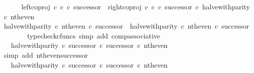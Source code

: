 \begin{isabellebody}
\ \ \ \ \ \ {\isacharparenleft}{\kern0pt}{\isacharparenleft}{\kern0pt}left{\isacharunderscore}{\kern0pt}coproj\ {\isasymnat}\isactrlsub c\ {\isasymnat}\isactrlsub c\ {\isasymcirc}\isactrlsub c\ successor{\isacharparenright}{\kern0pt}\ {\isasymamalg}\ {\isacharparenleft}{\kern0pt}right{\isacharunderscore}{\kern0pt}coproj\ {\isasymnat}\isactrlsub c\ {\isasymnat}\isactrlsub c\ {\isasymcirc}\isactrlsub c\ successor{\isacharparenright}{\kern0pt}{\isacharparenright}{\kern0pt}\ {\isasymcirc}\isactrlsub c\ halve{\isacharunderscore}{\kern0pt}with{\isacharunderscore}{\kern0pt}parity\ {\isasymcirc}\isactrlsub c\ nth{\isacharunderscore}{\kern0pt}even{\isachardoublequoteclose}\isanewline
\ \ \isamarkupfalse%
\ {\isacharminus}{\kern0pt}\isanewline
\ \ \ \ \isamarkupfalse%
\ {\isachardoublequoteopen}{\isacharparenleft}{\kern0pt}halve{\isacharunderscore}{\kern0pt}with{\isacharunderscore}{\kern0pt}parity\ {\isasymcirc}\isactrlsub c\ nth{\isacharunderscore}{\kern0pt}even{\isacharparenright}{\kern0pt}\ {\isasymcirc}\isactrlsub c\ successor\ {\isacharequal}{\kern0pt}\ halve{\isacharunderscore}{\kern0pt}with{\isacharunderscore}{\kern0pt}parity\ {\isasymcirc}\isactrlsub c\ nth{\isacharunderscore}{\kern0pt}even\ {\isasymcirc}\isactrlsub c\ successor{\isachardoublequoteclose}\isanewline
\ \ \ \ \ \ \isamarkupfalse%
\ {\isacharparenleft}{\kern0pt}typecheck{\isacharunderscore}{\kern0pt}cfuncs{\isacharcomma}{\kern0pt}\ simp\ add{\isacharcolon}{\kern0pt}\ comp{\isacharunderscore}{\kern0pt}associative{}{\isacharparenright}{\kern0pt}\isanewline
\ \ \ \ \isamarkupfalse%
\ \isamarkupfalse%
\ {\isachardoublequoteopen}{\isachardot}{\kern0pt}{\isachardot}{\kern0pt}{\isachardot}{\kern0pt}\ {\isacharequal}{\kern0pt}\ halve{\isacharunderscore}{\kern0pt}with{\isacharunderscore}{\kern0pt}parity\ {\isasymcirc}\isactrlsub c\ {\isacharparenleft}{\kern0pt}successor\ {\isasymcirc}\isactrlsub c\ successor{\isacharparenright}{\kern0pt}\ {\isasymcirc}\isactrlsub c\ nth{\isacharunderscore}{\kern0pt}even{\isachardoublequoteclose}\isanewline
\ \ \ \ \ \ \isamarkupfalse%
\ {\isacharparenleft}{\kern0pt}simp\ add{\isacharcolon}{\kern0pt}\ nth{\isacharunderscore}{\kern0pt}even{\isacharunderscore}{\kern0pt}successor{\isacharparenright}{\kern0pt}\isanewline
\ \ \ \ \isamarkupfalse%
\ \isamarkupfalse%
\ {\isachardoublequoteopen}{\isachardot}{\kern0pt}{\isachardot}{\kern0pt}{\isachardot}{\kern0pt}\ {\isacharequal}{\kern0pt}\ {\isacharparenleft}{\kern0pt}{\isacharparenleft}{\kern0pt}halve{\isacharunderscore}{\kern0pt}with{\isacharunderscore}{\kern0pt}parity\ {\isasymcirc}\isactrlsub c\ successor{\isacharparenright}{\kern0pt}\ {\isasymcirc}\isactrlsub c\ successor{\isacharparenright}{\kern0pt}\ {\isasymcirc}\isactrlsub c\ nth{\isacharunderscore}{\kern0pt}even{\isachardoublequoteclose}\isanewline

\end{isabellebody}
